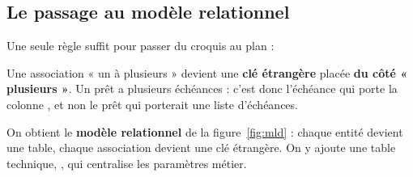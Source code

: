 \subsection{Le passage au modèle relationnel}

Une seule règle suffit pour passer du croquis au plan :

\begin{regle}
Une association « un à plusieurs » devient une \textbf{clé étrangère} placée \textbf{du côté
« plusieurs »}. Un prêt a plusieurs échéances : c'est donc l'échéance qui porte la colonne
, et non le prêt qui porterait une liste d'échéances.
\end{regle}

On obtient le \textbf{modèle relationnel} de la figure~\ref{fig:mld} : chaque entité devient une table,
chaque association devient une clé étrangère. On y ajoute une table technique,
, qui centralise les paramètres métier.

